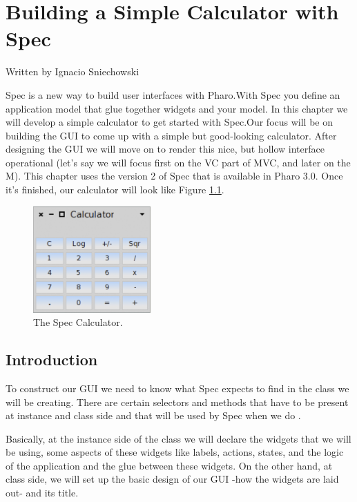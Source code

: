 \documentclass[a4paper,10pt,twoside]{book}
\begin{document}
\fi
\sloppy

\chapter{Building a Simple Calculator with Spec}
Written by Ignacio Sniechowski

Spec is a new way to build user interfaces with Pharo.With Spec you define an application model that glue together widgets and your model. In this chapter we will develop a simple calculator to get started with Spec.Our focus will be on building the GUI to come up with a simple but good-looking calculator.
After designing the GUI we will move on to render this nice, but hollow interface operational (let's say we will focus first on the VC part of MVC, and later on the M). This chapter uses the version 2 of Spec that is available in Pharo 3.0.
Once it's finished, our calculator will look like Figure \ref{specalc}.

\begin{figure}

\begin{center}
\includegraphics[width=0.4\textwidth]{figures/Specalc.png}\caption{The Spec Calculator.\label{specalc}}\end{center}
\end{figure}

\section{Introduction}
To construct our GUI we need to know what Spec expects to find in the class we will be creating. There are certain selectors and methods that have to be present at instance and class side and that will be used by Spec when we do .

Basically, at the instance side of the class we will declare the widgets that we will be using, some aspects of these widgets like labels, actions, states, and the logic of the application and the glue between these widgets. On the other hand, at class side, we will set up the basic design of our GUI -how the widgets are laid out- and its title.
\end{document}

